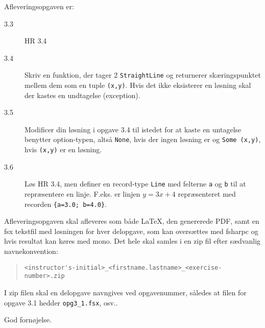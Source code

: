 \documentclass[a4paper,12pt]{article}
\begin{document}
Afleveringsopgaven er:
\begin{description}
\item[3.3] HR  3.4
\item[3.4] Skriv en funktion, der tager 2 \lstinline|StraightLine| og
  returnerer skæringspunktet mellem dem som en tuple
  \lstinline|(x,y)|. Hvis det ikke eksisterer en løsning skal der
  kastes en undtagelse (exception).
\item[3.5] Modificer din løsning i opgave 3.4 til istedet for at kaste
  en untagelse benytter option-typen, altså
  \lstinline|None|, hvis der ingen løsning er og
  \lstinline|Some (x,y)|, hvis \lstinline|(x,y)| er en løsning.
\item[3.6] Løs HR 3.4, men definer en record-type \lstinline|Line| med felterne \lstinline|a| og \lstinline|b| til at repræsentere en linje.  F.eks. er linjen $y=3x+4$ repræsenteret med recorden \lstinline|{a=3.0; b=4.0}|.
\end{description}
Afleveringsopgaven skal afleveres som både LaTeX, den genererede PDF, samt en fsx tekstfil med løsningen for hver delopgave, som kan oversættes med fsharpc og hvis resultat kan køres med mono. Det hele skal samles i en zip fil efter sædvanlig navnekonvention:
\begin{quote}
  \lstinline|<instructor's-initial>_<firstname.lastname>_<exercise-number>.zip|
\end{quote}
I zip filen skal en delopgave navngives ved opgavenummer, således at
filen for opgave 3.1 hedder \lstinline|opg3_1.fsx|, osv..

\flushright God fornøjelse.
\end{document}
